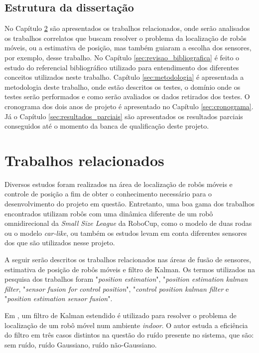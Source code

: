\documentclass[acronym, symbols, table]{fei}
\begin{document}
	\section{Estrutura da dissertação}
	
		No Capítulo \ref{sec:trab_relacionados} são apresentados os trabalhos relacionados, onde serão analisados os trabalhos correlatos que buscam resolver o problema da localização de robôs móveis, ou a estimativa de posição, mas também guiaram a escolha dos sensores, por exemplo, desse trabalho. No Capítulo \ref{sec:revisao_bibliografica} é feito o estudo do referencial bibliográfico utilizado para entendimento dos diferentes conceitos utilizados neste trabalho. Capítulo \ref{sec:metodologia} é apresentada a metodologia deste trabalho, onde estão descritos os testes, o domínio onde os testes serão performados e como serão avaliados os dados retirados dos testes. O cronograma dos dois anos de projeto é apresentado no Capítulo \ref{sec:cronograma}. Já o Capítulo \ref{sec:resultados_parciais} são apresentados os resultados parciais conseguidos até o momento da banca de qualificação deste projeto.
		
\chapter{Trabalhos relacionados}\label{sec:trab_relacionados}
	Diversos estudos foram realizados na área de localização de robôs móveis e controle de posição a fim de obter o conhecimento necessário para o desenvolvimento do projeto em questão. Entretanto, uma boa gama dos trabalhos encontrados utilizam robôs com uma dinâmica diferente de um robô omnidirecional da \textit{Small Size League} da RoboCup, como o modelo de duas rodas ou o modelo \textit{car-like}, ou também os estudos levam em conta diferentes sensores dos que são utilizados nesse projeto.
	
	A seguir serão descritos os trabalhos relacionados nas áreas de fusão de sensores, estimativa de posição de robôs móveis e filtro de Kalman. Os termos utilizados na pesquisa dos trabalhos foram "\textit{position estimation}", "\textit{position estimation kalman filter}, "\textit{sensor fusion for control position}", "\textit{control position kalman filter} e "\textit{position estimation sensor fusion}".
	
	Em \textcite{eman2020mobile}, um filtro de Kalman estendido é utilizado para resolver o problema de localização de um robô móvel num ambiente \textit{indoor}. O autor estuda a eficiência do filtro em três casos distintos na questão do ruído presente no sistema, que são: sem ruído, ruído Gaussiano, ruído não-Gaussiano.
	
\end{document}
